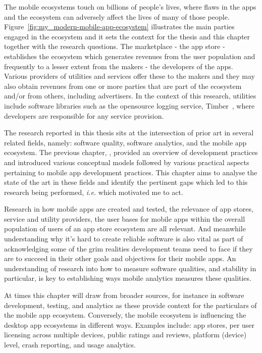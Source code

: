 The mobile ecosystems touch on billions of people's lives, where flaws in the apps and the ecosystem can adversely affect the lives of many of those people. Figure~\ref{fig:my_modern-mobile-app-ecosystem} illustrates the main parties engaged in the ecosystem %
and it sets the context for the thesis and this chapter together with the research questions. The marketplace - the app store - establishes the ecosystem which generates revenues from the user population and frequently to a lesser extent from the makers -  the developers of the apps. Various providers of utilities and services offer these to the makers and they may also obtain revenues from one or more parties that are part of the ecosystem and/or from others, including advertisers. In the context of this research, utilities include software libraries such as the opensource logging service, Timber~, where developers are responsible for any service provision. 

The research reported in this thesis sits at the intersection of prior art in several related fields, namely: software quality, software analytics, and the mobile app ecosystem. %
The previous chapter, , provided an overview of development practices and introduced various conceptual models followed by various practical aspects pertaining to mobile app development practices.  
This chapter aims to analyse the state of the art in these fields and identify the pertinent gaps which led to this research being performed, \emph{i.e.} which motivated me to act.  

Research in how mobile apps are created and tested, the relevance of app stores, service and utility providers, the user bases for mobile apps within the overall population of users of an app store ecosystem are all relevant. And meanwhile understanding why it's hard to create reliable software is also vital as part of acknowledging some of the grim realities development teams need to face if they are to succeed in their other goals and objectives for their mobile apps. An understanding of research into how to measure software qualities, and stability in particular, is key to establishing ways mobile analytics measures these qualities. 

At times this chapter will draw from broader sources, for instance in software development, testing, and analytics as these provide context for the particulars of the mobile app ecosystem. Conversely, the mobile ecosystem is influencing the desktop app ecosystems in different ways. 
Examples include: app stores, per user licensing across multiple devices, public ratings and reviews, platform (device) level, crash reporting, and usage analytics.


